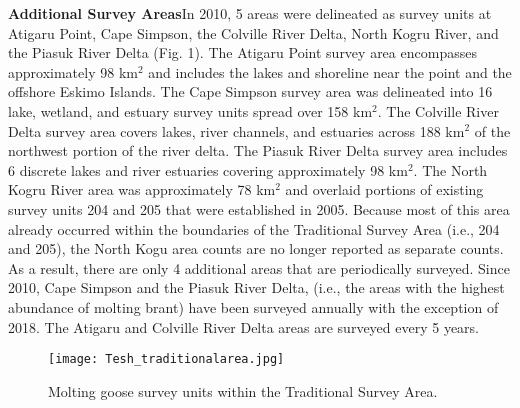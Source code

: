 \documentclass[
]{article}
\begin{document}
\textbf{Additional Survey Areas}\hfill\break In 2010, 5 areas were
delineated as survey units at Atigaru Point, Cape Simpson, the Colville
River Delta, North Kogru River, and the Piasuk River Delta (Fig. 1). The
Atigaru Point survey area encompasses approximately 98 km\(^{2}\) and
includes the lakes and shoreline near the point and the offshore Eskimo
Islands. The Cape Simpson survey area was delineated into 16 lake,
wetland, and estuary survey units spread over 158 km\(^{2}\). The
Colville River Delta survey area covers lakes, river channels, and
estuaries across 188 km\(^{2}\) of the northwest portion of the river
delta. The Piasuk River Delta survey area includes 6 discrete lakes and
river estuaries covering approximately 98 km\(^{2}\). The North Kogru
River area was approximately 78 km\(^{2}\) and overlaid portions of
existing survey units 204 and 205 that were established in 2005. Because
most of this area already occurred within the boundaries of the
Traditional Survey Area (i.e., 204 and 205), the North Kogu area counts
are no longer reported as separate counts. As a result, there are only 4
additional areas that are periodically surveyed. Since 2010, Cape
Simpson and the Piasuk River Delta, (i.e., the areas with the highest
abundance of molting brant) have been surveyed annually with the
exception of 2018. The Atigaru and Colville River Delta areas are
surveyed every 5 years.

\begin{figure}[ht]
\texttt{[image: Tesh\_traditionalarea.jpg]}
\caption{Molting goose survey units within the Traditional Survey Area.}
\end{figure}

\newpage
\end{document}
